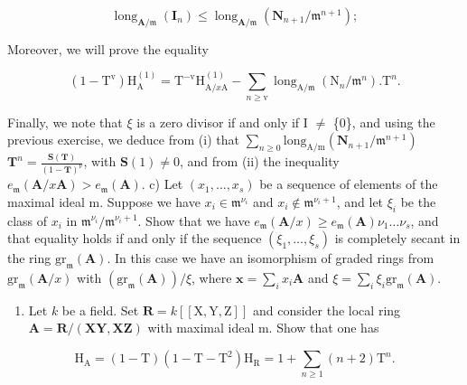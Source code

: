 \[
\operatorname{long} _ {\mathbf {A} / \mathfrak {m}} (\mathbf {I} _ {n}) \leqslant \operatorname{long} _ {\mathbf {A} / \mathfrak {m}} (\mathbf {N} _ {n + 1} / \mathfrak {m} ^ {n + 1});\tag{i}
\]

Moreover, we will prove the equality

\[
(1 - \mathrm{T} ^ {\mathrm{v}}) \mathrm{H} _ {\mathrm{A}} ^ {(1)} = \mathrm{T} ^ {- \mathrm{v}} \mathrm{H} _ {\mathrm{A} / x \mathrm{A}} ^ {(1)} - \sum_ {n \geqslant \mathrm{v}} \operatorname{long} _ {\mathrm{A} / \mathfrak {m}} (\mathrm{N} _ {n} / \mathfrak {m} ^ {n}). \mathrm{T} ^ {n}.\tag{ii}
\]

Finally, we note that \(\xi\) is a zero divisor if and only if I \(\neq\) \{0\}, and using the previous exercise, we deduce from (i) that \(\sum_{n\geqslant 0}\mathrm{long}_{\mathrm{A / m}}(\mathbf{N}_{n + 1} / \mathfrak{m}^{n + 1})\) \(\mathbf{T}^n = \frac{\mathbf{S}(\mathbf{T})}{(1 - \mathbf{T})^\nu}\), with \(\mathbf{S}(1)\neq 0\), and from (ii) the inequality \(e_{\mathfrak{m}}(\mathbf{A} / x\mathbf{A}) > e_{\mathfrak{m}}(\mathbf{A})\). c) Let \((x_{1},\dots,x_{s})\) be a sequence of elements of the maximal ideal m. Suppose we have \(x_{i}\in \mathfrak{m}^{\nu_i}\) and \(x_{i}\notin \mathfrak{m}^{\nu_i + 1}\), and let \(\xi_{i}\) be the class of \(x_{i}\) in \(\mathfrak{m}^{\nu_i} / \mathfrak{m}^{\nu_i + 1}\). Show that we have \(e_{\mathfrak{m}}(\mathbf{A} / x)\geqslant e_{\mathfrak{m}}(\mathbf{A})\nu_{1}\dots \nu_{s}\), and that equality holds if and only if the sequence \((\xi_1,\dots,\xi_s)\) is completely secant in the ring \(\mathrm{gr}_{\mathfrak{m}}(\mathbf{A})\). In this case we have an isomorphism of graded rings from \(\mathrm{gr}_{\mathfrak{m}}(\mathbf{A} / x)\) with \((\mathrm{gr}_{\mathfrak{m}}(\mathbf{A}))/\xi\), where \(\mathbf{x} = \sum_{i}x_{i}\mathbf{A}\) and \(\xi = \sum_{i}\xi_{i}\mathrm{gr}_{\mathfrak{m}}(\mathbf{A})\).

\begin{enumerate}
\def\labelenumi{\arabic{enumi})}
\setcounter{enumi}{4}
\tightlist
\item
  Let \(k\) be a field. Set \(\mathbf{R} = k[[\mathrm{X},\mathrm{Y},\mathrm{Z}]]\) and consider the local ring \(\mathbf{A} = \mathbf{R}/(\mathbf{XY},\mathbf{X}\mathbf{Z})\) with maximal ideal m. Show that one has
\end{enumerate}

\[
\mathrm{H} _ {\mathrm{A}} = (1 - \mathrm{T}) (1 - \mathrm{T} - \mathrm{T} ^ {2}) \mathrm{H} _ {\mathrm{R}} = 1 + \sum_ {n \geqslant 1} (n + 2) \mathrm{T} ^ {n}.
\]

